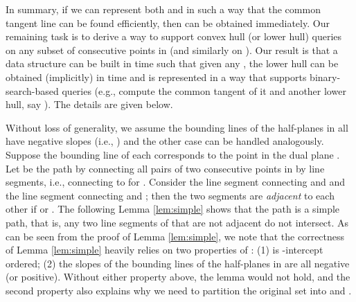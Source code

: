 \documentclass{llncs}
\begin{document}
In summary,
if we can represent both  and  in such a way that
the common tangent line can be found efficiently, then 
can be obtained immediately. Our remaining task is to derive a way to
support convex hull (or lower hull) queries on any subset of consecutive points in
 (and similarly
on ). Our result is that a data structure can be built in
 time such that given any , the lower hull
 can be obtained (implicitly) in  time and is represented
in a way that supports binary-search-based queries (e.g., compute the
common tangent of it and another lower hull, say ). The
details are given below.

Without loss of generality, we assume the
bounding lines of the half-planes in  all have negative slopes
(i.e., ) and the other case can be handled analogously. Suppose
the bounding line of each  corresponds to the point 
in the dual plane . Let  be the path by connecting all
pairs of two consecutive points in  by line segments, i.e.,
connecting  to 
for . Consider the line segment connecting  and
 and the line segment connecting  and ; then
the two segments are {\em adjacent} to each other if  or
. The following Lemma \ref{lem:simple} shows that the path
 is a simple path, that is, any two line segments of 
that are not adjacent do not intersect.
As can be seen from the proof of Lemma \ref{lem:simple}, we note that
the correctness of Lemma \ref{lem:simple} heavily relies on two properties of :
(1)  is -intercept ordered; (2) the slopes of the bounding lines
of the half-planes in  are all negative (or positive). Without
either property above, the lemma would not hold, and the second
property also
explains why we need to partition the original set  into  and
.
\end{document}
